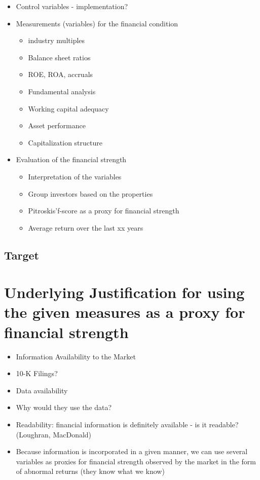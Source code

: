 \documentclass[12pt]{article}
\begin{document}
    \begin{itemize}
        \item Control variables - implementation?
    
        \item Measurements (variables) for the financial condition 
    
            \begin{itemize}
            \item industry multiples
            \item Balance sheet ratios
            \item ROE, ROA, accruals 
            \item Fundamental analysis
            \item Working capital adequacy
            \item Asset performance
            \item Capitalization structure
            \end{itemize}
    
        \item Evaluation of the financial strength
    
            \begin{itemize}
            \item Interpretation of the variables
            \item Group investors based on the properties
            \item Pitroskis'f-score as a proxy for financial strength
            \item Average return over the last xx years 
            \end{itemize}

    
    \end{itemize}

    \subsection{Target}

\section{Underlying Justification for using the given measures as a proxy for financial strength}

    \begin{itemize}
        \item Information Availability to the Market
        \item 10-K Filings? 
        \item Data availability
        \item Why would they use the data?
        \item Readability: financial information is definitely available - is it readable? (Loughran, MacDonald)
        \item Because information is incorporated in a given manner, we can use several variables as proxies for financial strength observed by the market in the form of abnormal returns (they know what we know)
    \end{itemize}
\end{document}
